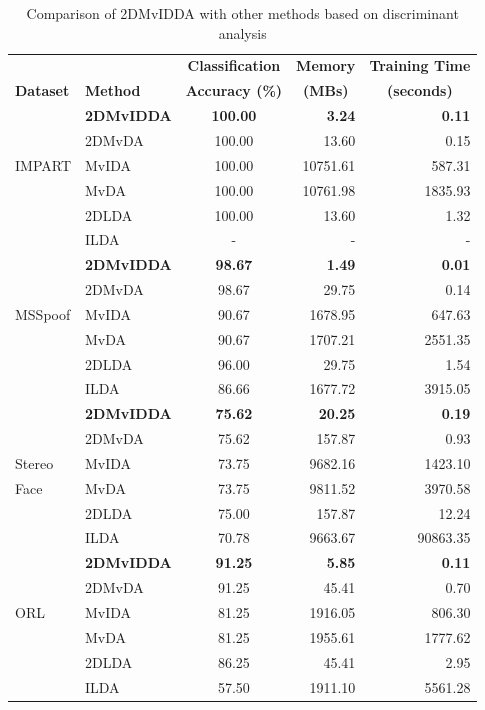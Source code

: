 \begin{table}[t]
	\centering
	\caption{Comparison of 2DMvIDDA with other methods based on discriminant analysis}
	\label{tab:2DMvIDDA_Res_All_RS}
	\begin{tabular}{l l c r r} \hline
		
		 &  & \textbf{Classification} & \multicolumn{1}{c}{\textbf{Memory}} & \textbf{Training Time} \\
		\textbf{Dataset} & \textbf{Method} & \textbf{Accuracy (\%)} & \multicolumn{1}{c}{\textbf{(MBs)}} & \multicolumn{1}{c}{\textbf{(seconds)}} \\ \hline
		 
		       & \textbf{2DMvIDDA} & \textbf{100.00} & \textbf{3.24} & \textbf{0.11} \\ 
			   & 2DMvDA   & 100.00 & 13.60 & 0.15 \\ 
		IMPART & MvIDA    & 100.00 & 10751.61 & 587.31 \\ 
			   & MvDA     & 100.00 & 10761.98 & 1835.93 \\ 
			   & 2DLDA    & 100.00 & 13.60 & 1.32 \\ 
			   & ILDA     & - & - & - \\ \hline
	
			   & \textbf{2DMvIDDA} & \textbf{98.67} & \textbf{1.49} & \textbf{0.01} \\ 
			   & 2DMvDA   & 98.67 & 29.75 & 0.14 \\ 
	   MSSpoof & MvIDA    & 90.67 & 1678.95 & 647.63 \\ 
			   & MvDA     & 90.67 & 1707.21 & 2551.35 \\ 
			   & 2DLDA    & 96.00 & 29.75 & 1.54 \\ 
			   & ILDA     & 86.66 & 1677.72 & 3915.05 \\ \hline
	
			   & \textbf{2DMvIDDA} & \textbf{75.62} & \textbf{20.25} & \textbf{0.19} \\ 
			   & 2DMvDA   & 75.62 & 157.87 & 0.93 \\ 
		Stereo & MvIDA    & 73.75 & 9682.16 & 1423.10 \\ 
		Face   & MvDA     & 73.75 & 9811.52 & 3970.58 \\ 
			   & 2DLDA    & 75.00 & 157.87 & 12.24 \\ 
			   & ILDA     & 70.78 & 9663.67 & 90863.35 \\ \hline
	
			   & \textbf{2DMvIDDA} & \textbf{91.25} & \textbf{5.85} & \textbf{0.11} \\ 
			   & 2DMvDA   & 91.25 & 45.41 & 0.70 \\ 
		ORL    & MvIDA    & 81.25 & 1916.05 & 806.30 \\ 
			   & MvDA     & 81.25 & 1955.61 & 1777.62 \\ 
			   & 2DLDA    & 86.25 & 45.41 & 2.95 \\ 
			   & ILDA     & 57.50 & 1911.10 & 5561.28 \\ \hline
	\end{tabular}
\end{table}

